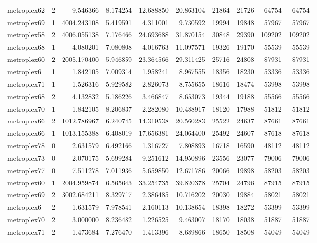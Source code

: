\begin{longtable}{|l|r|r|r|r|r|r|r|r|r|}
metroplex62 & 2 & 9.546366 & 8.174254 & 12.688850 & 20.863104 & 21864 & 21726 & 64754 & 64754 \\
metroplex69 & 1 & 4004.243108 & 5.419591 & 4.311001 & 9.730592 & 19994 & 19848 & 57967 & 57967 \\
metroplex58 & 2 & 4006.055138 & 7.176466 & 24.693688 & 31.870154 & 30848 & 29390 & 109202 & 109202 \\
metroplex68 & 1 & 4.080201 & 7.080808 & 4.016763 & 11.097571 & 19326 & 19170 & 55539 & 55539 \\
metroplex60 & 2 & 2005.170400 & 5.946859 & 23.364566 & 29.311425 & 25716 & 24808 & 87931 & 87931 \\
metroplex6 & 1 & 1.842105 & 7.009314 & 1.958241 & 8.967555 & 18356 & 18230 & 53336 & 53336 \\
metroplex71 & 1 & 1.526316 & 5.929582 & 2.826073 & 8.755655 & 18616 & 18474 & 53998 & 53998 \\
metroplex68 & 2 & 4.132832 & 5.186226 & 3.466847 & 8.653073 & 19344 & 19188 & 55566 & 55566 \\
metroplex70 & 1 & 1.842105 & 8.206837 & 2.282080 & 10.488917 & 18120 & 17988 & 51812 & 51812 \\
metroplex66 & 2 & 1012.786967 & 6.240745 & 14.319538 & 20.560283 & 25522 & 24637 & 87661 & 87661 \\
metroplex66 & 1 & 1013.155388 & 6.408019 & 17.656381 & 24.064400 & 25492 & 24607 & 87618 & 87618 \\
metroplex78 & 0 & 2.631579 & 6.492166 & 1.316727 & 7.808893 & 16718 & 16590 & 48112 & 48112 \\
metroplex73 & 0 & 2.070175 & 5.699284 & 9.251612 & 14.950896 & 23556 & 23077 & 79006 & 79006 \\
metroplex77 & 0 & 7.511278 & 7.011936 & 5.659850 & 12.671786 & 20066 & 19898 & 58203 & 58203 \\
metroplex60 & 1 & 2004.959874 & 6.565643 & 33.254735 & 39.820378 & 25704 & 24796 & 87915 & 87915 \\
metroplex69 & 2 & 3002.684211 & 8.329717 & 2.386485 & 10.716202 & 20030 & 19884 & 58021 & 58021 \\
metroplex6 & 2 & 1.631579 & 7.978541 & 2.160113 & 10.138654 & 18398 & 18272 & 53399 & 53399 \\
metroplex70 & 2 & 3.000000 & 8.236482 & 1.226525 & 9.463007 & 18170 & 18038 & 51887 & 51887 \\
metroplex71 & 2 & 1.473684 & 7.276470 & 1.413396 & 8.689866 & 18650 & 18508 & 54049 & 54049 \\

\end{longtable}
